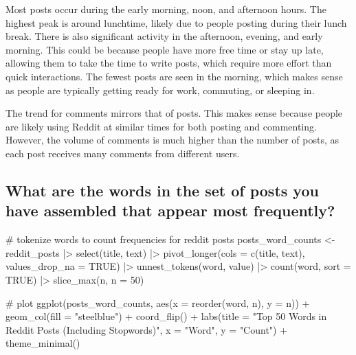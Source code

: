 \documentclass[
  letterpaper,
  DIV=11,
  numbers=noendperiod]{scrartcl}
\newenvironment{Shaded}{\begin{snugshade}}{\end{snugshade}}
\newcommand{\AttributeTok}[1]{\textcolor[rgb]{0.40,0.45,0.13}{#1}}
\newcommand{\CommentTok}[1]{\textcolor[rgb]{0.37,0.37,0.37}{#1}}
\newcommand{\ConstantTok}[1]{\textcolor[rgb]{0.56,0.35,0.01}{#1}}
\newcommand{\DecValTok}[1]{\textcolor[rgb]{0.68,0.00,0.00}{#1}}
\newcommand{\FunctionTok}[1]{\textcolor[rgb]{0.28,0.35,0.67}{#1}}
\newcommand{\NormalTok}[1]{\textcolor[rgb]{0.00,0.23,0.31}{#1}}
\newcommand{\OtherTok}[1]{\textcolor[rgb]{0.00,0.23,0.31}{#1}}
\newcommand{\SpecialCharTok}[1]{\textcolor[rgb]{0.37,0.37,0.37}{#1}}
\newcommand{\StringTok}[1]{\textcolor[rgb]{0.13,0.47,0.30}{#1}}
\begin{document}
Most posts occur during the early morning, noon, and afternoon hours.
The highest peak is around lunchtime, likely due to people posting
during their lunch break. There is also significant activity in the
afternoon, evening, and early morning. This could be because people have
more free time or stay up late, allowing them to take the time to write
posts, which require more effort than quick interactions. The fewest
posts are seen in the morning, which makes sense as people are typically
getting ready for work, commuting, or sleeping in.

The trend for comments mirrors that of posts. This makes sense because
people are likely using Reddit at similar times for both posting and
commenting. However, the volume of comments is much higher than the
number of posts, as each post receives many comments from different
users.

\subsection{What are the words in the set of posts you have assembled
that appear most
frequently?}\label{what-are-the-words-in-the-set-of-posts-you-have-assembled-that-appear-most-frequently}

\begin{Shaded}
\begin{Highlighting}[]
\CommentTok{\# tokenize words to count frequencies for reddit posts}
\NormalTok{posts\_word\_counts }\OtherTok{\textless{}{-}}\NormalTok{ reddit\_posts }\SpecialCharTok{|\textgreater{}}
  \FunctionTok{select}\NormalTok{(title, text) }\SpecialCharTok{|\textgreater{}}
  \FunctionTok{pivot\_longer}\NormalTok{(}\AttributeTok{cols =} \FunctionTok{c}\NormalTok{(title, text), }\AttributeTok{values\_drop\_na =} \ConstantTok{TRUE}\NormalTok{) }\SpecialCharTok{|\textgreater{}}
  \FunctionTok{unnest\_tokens}\NormalTok{(word, value) }\SpecialCharTok{|\textgreater{}}
  \FunctionTok{count}\NormalTok{(word, }\AttributeTok{sort =} \ConstantTok{TRUE}\NormalTok{) }\SpecialCharTok{|\textgreater{}}
  \FunctionTok{slice\_max}\NormalTok{(n, }\AttributeTok{n =} \DecValTok{50}\NormalTok{)}

\CommentTok{\# plot}
\FunctionTok{ggplot}\NormalTok{(posts\_word\_counts, }\FunctionTok{aes}\NormalTok{(}\AttributeTok{x =} \FunctionTok{reorder}\NormalTok{(word, n), }\AttributeTok{y =}\NormalTok{ n)) }\SpecialCharTok{+}
  \FunctionTok{geom\_col}\NormalTok{(}\AttributeTok{fill =} \StringTok{"steelblue"}\NormalTok{) }\SpecialCharTok{+}
  \FunctionTok{coord\_flip}\NormalTok{() }\SpecialCharTok{+}
  \FunctionTok{labs}\NormalTok{(}\AttributeTok{title =} \StringTok{"Top 50 Words in Reddit Posts (Including Stopwords)"}\NormalTok{,}
       \AttributeTok{x =} \StringTok{"Word"}\NormalTok{,}
       \AttributeTok{y =} \StringTok{"Count"}\NormalTok{) }\SpecialCharTok{+}
  \FunctionTok{theme\_minimal}\NormalTok{()}
\end{Highlighting}
\end{Shaded}
\end{document}
